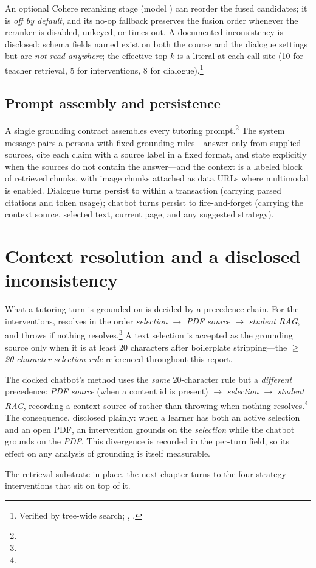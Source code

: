 An optional Cohere reranking stage (model ) can
reorder the fused candidates; it is \emph{off by default}, and its no-op
fallback preserves the fusion order whenever the reranker is disabled,
unkeyed, or times out. A documented inconsistency is disclosed: schema
fields named  exist on both the course and the dialogue
settings but are \emph{not read anywhere}; the effective top-$k$ is a
literal at each call site (10 for teacher retrieval, 5 for interventions,
8 for dialogue).\footnote{Verified by tree-wide search;
, .}

\subsection{Prompt assembly and persistence}
\label{sec:modes-prompt}

A single grounding contract assembles every tutoring
prompt.\footnote{} The
system message pairs a persona with fixed grounding rules---answer only
from supplied sources, cite each claim with a source label in a fixed
format, and state explicitly when the sources do not contain the
answer---and the context is a labeled block of retrieved chunks, with
image chunks attached as data URLs where multimodal is enabled.
Dialogue turns persist to  within a transaction
(carrying parsed citations and token usage); chatbot turns persist to
 fire-and-forget (carrying the context source,
selected text, current page, and any suggested strategy).

\section{Context resolution and a disclosed inconsistency}
\label{sec:modes-context}

What a tutoring turn is grounded on is decided by a precedence chain.
For the interventions,  resolves in the
order \emph{selection} $\rightarrow$ \emph{PDF source} $\rightarrow$
\emph{student RAG}, and throws if nothing
resolves.\footnote{} A text
selection is accepted as the grounding source only when it is at least 20
characters after boilerplate stripping---the \emph{$\geq$20-character
selection rule} referenced throughout this report.

The docked chatbot's  method uses the \emph{same}
20-character rule but a \emph{different} precedence: \emph{PDF source}
(when a content id is present) $\rightarrow$ \emph{selection} $\rightarrow$
\emph{student RAG}, recording a context source of  rather than
throwing when nothing
resolves.\footnote{}
The consequence, disclosed plainly: when a learner has both an active
selection and an open PDF, an intervention grounds on the \emph{selection}
while the chatbot grounds on the \emph{PDF}. This divergence is recorded
in the per-turn  field, so its effect on any analysis
of grounding is itself measurable.

\medskip
\noindent The retrieval substrate in place, the next chapter turns to the
four strategy interventions that sit on top of it.
